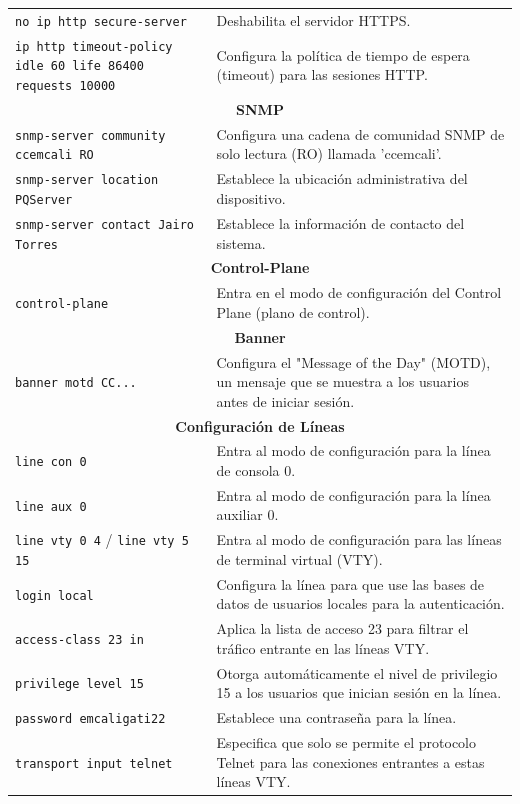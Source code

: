 \documentclass[a5paper]{book}%
\begin{document}
\begin{longtable}{|p{6cm}|p{4cm}|}
\texttt{no ip http secure-server} & Deshabilita el servidor HTTPS. \\
\texttt{ip http timeout-policy idle 60 life 86400 requests 10000} & Configura la política de tiempo de espera (timeout) para las sesiones HTTP. \\
\multicolumn{2}{|c|}{\textbf{SNMP}}\\\hline
\texttt{snmp-server community ccemcali RO} & Configura una cadena de comunidad SNMP de solo lectura (RO) llamada 'ccemcali'. \\
\texttt{snmp-server location PQServer} & Establece la ubicación administrativa del dispositivo. \\
\texttt{snmp-server contact Jairo Torres} & Establece la información de contacto del sistema. \\
\multicolumn{2}{|c|}{\textbf{Control-Plane}}\\\hline
\texttt{control-plane} & Entra en el modo de configuración del Control Plane (plano de control). \\
\multicolumn{2}{|c|}{\textbf{Banner}}\\\hline
\texttt{banner motd \textvisiblespace CC... \textvisiblespace} & Configura el "Message of the Day" (MOTD), un mensaje que se muestra a los usuarios antes de iniciar sesión. \\
\multicolumn{2}{|c|}{\textbf{Configuración de Líneas}}\\\hline
\texttt{line con 0} & Entra al modo de configuración para la línea de consola 0. \\
\texttt{line aux 0} & Entra al modo de configuración para la línea auxiliar 0. \\
\texttt{line vty 0 4} / \texttt{line vty 5 15} & Entra al modo de configuración para las líneas de terminal virtual (VTY). \\
\texttt{login local} & Configura la línea para que use las bases de datos de usuarios locales para la autenticación. \\
\texttt{access-class 23 in} & Aplica la lista de acceso 23 para filtrar el tráfico entrante en las líneas VTY. \\
\texttt{privilege level 15} & Otorga automáticamente el nivel de privilegio 15 a los usuarios que inician sesión en la línea. \\
\texttt{password emcaligati22} & Establece una contraseña para la línea. \\
\texttt{transport input telnet} & Especifica que solo se permite el protocolo Telnet para las conexiones entrantes a estas líneas VTY. \\

\end{longtable}
\end{document}
